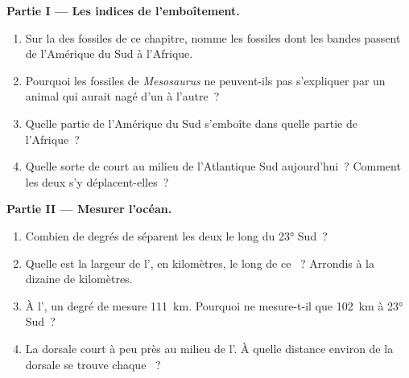 \begin{problem}
\medskip
\noindent\textbf{Partie I --- Les indices de l'emboîtement.}
\begin{enumerate}
  \item Sur la  des fossiles de ce chapitre, nomme les fossiles dont
        les bandes passent de l'Amérique du Sud à l'Afrique.
  \item Pourquoi les fossiles de \emph{Mesosaurus} ne peuvent-ils pas
        s'expliquer par un animal qui aurait nagé d'un  à l'autre~?
  \item Quelle partie de l'Amérique du Sud s'emboîte dans quelle partie de
        l'Afrique~?
  \item Quelle sorte de  court au milieu de l'Atlantique
        Sud aujourd'hui~? Comment les deux  s'y déplacent-elles~?
\end{enumerate}

\medskip
\noindent\textbf{Partie II --- Mesurer l'océan.}
\begin{enumerate}[resume]
  \item Combien de degrés de  séparent les deux  le long du
         \ang{23} Sud~?
  \item Quelle est la largeur de l', en kilomètres, le long de ce
        ~? Arrondis à la dizaine de kilomètres.
  \item À l', un degré de  mesure \qty{111}{km}. Pourquoi
        ne mesure-t-il que \qty{102}{km} à \ang{23} Sud~?
  \item La dorsale court à peu près au milieu de l'. À quelle distance
        environ de la dorsale se trouve chaque ~?
\end{enumerate}


\end{problem}
